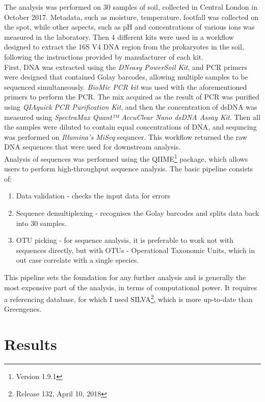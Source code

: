 \documentclass[twoside,twocolumn]{article}
\begin{document}
The analysis was performed on 30 samples of soil, collected in Central London in October 2017. Metadata, such as moisture, temperature, footfall was collected on the spot, while other aspects, such as pH and concentrations of various ions was measured in the laboratory. Then 4 different kits were used in a workflow designed to extract the 16S V4 DNA region from the prokaryotes in the soil, following the instructions provided by manufacturer of each kit. \\
%
First, DNA was extracted using the \textit{DNeasy PowerSoil Kit}, and PCR primers were designed that contained Golay barcodes, allowing multiple samples to be sequenced simultaneously. \textit{BioMic PCR kit} was used with the aforementioned primers to perform the PCR. The mix acquired as the result of PCR was purified using \textit{QIAquick PCR Purification Kit}, and then the concentration of dsDNA was measured using \textit{SpectraMax Quant™ AccuClear Nano dsDNA Assay Kit}. Then all the samples were diluted to contain equal concentrations of DNA, and sequncing was performed on \textit{Illumina's MiSeq} sequncer. This workflow returned the raw DNA sequences that were used for downstream analysis.\\
%
Analysis of sequences was performed using the QIIME\footnote{Version 1.9.1} package\cite{Caporaso2010,Kuczynski2012}, which allows users to perform high-throughput sequence analysis. The basic pipeline consists of:
\begin{enumerate}
	\item Data validation - checks the input data for errors
	\item Sequence demultiplexing - recognises the Golay barcodes and splits data back into 30 samples.
	\item OTU picking - for sequence analysis, it is preferable to work not with sequences directly, but with OTUs - Operational Taxonomic Units, which in out case correlate with a single species.
\end{enumerate}
%
This pipeline sets the foundation for any further analysis and is generally the most expensive part of the analysis, in terms of computational power. It requires a referencing database, for which I used SILVA\cite{Quast2012}\footnote{Release 132, April 10, 2018}, which is more up-to-date than Greengenes\cite{McDonald2012}.\\




\section{Results}
\end{document}
